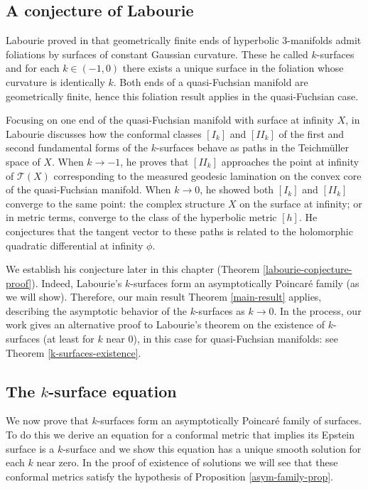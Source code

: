 \documentclass{amsart}
\newcommand{\two}{I\!\!I}
\begin{document}
\subsection{A conjecture of Labourie}



Labourie proved in \cite{labourie1991} that geometrically finite ends of hyperbolic 3-manifolds admit foliations by surfaces of constant Gaussian curvature. 
These he called $k$-surfaces and for each $k \in (-1,0)$ there exists a unique surface in the foliation whose curvature is identically $k$.
Both ends of a quasi-Fuchsian manifold are geometrically finite, hence this foliation result applies in the quasi-Fuchsian case.

Focusing on one end of the quasi-Fuchsian manifold with surface at infinity $X$, in \cite{labourie1992} Labourie discusses how the conformal classes $[I_k]$ and $[\two_k]$ of the first and second fundamental forms of the $k$-surfaces behave as paths in the Teichm\"uller space of $X$. 
When $k \to -1$, he proves that $[\two_k]$ approaches the point at infinity of $\mathcal{T}(X)$ corresponding to the measured geodesic lamination on the convex core of the quasi-Fuchsian manifold. 
When $k \to 0$, he showed both $[I_k]$ and $[\two_k]$ converge to the same point: the complex structure $X$ on the surface at infinity; or in metric terms, converge to the class of the hyperbolic metric $[h]$.
He conjectures that the tangent vector to these paths is related to the holomorphic quadratic differential at infinity $\phi$. 

We establish his conjecture later in this chapter (Theorem \ref{labourie-conjecture-proof}). 
Indeed, Labourie's $k$-surfaces form an asymptotically Poincar\'e family (as we will show). 
Therefore, our main result Theorem \ref{main-result} applies, describing the asymptotic behavior of the $k$-surfaces as $k \to 0$. 
In the process, our work gives an alternative proof to Labourie's theorem on the existence of $k$-surfaces (at least for $k$ near 0), in this case for quasi-Fuchsian manifolds: see Theorem \ref{k-surfaces-existence}.



\subsection{The $k$-surface equation}



We now prove that $k$-surfaces form an asymptotically Poincar\'e family of surfaces. 
To do this we derive an equation for a conformal metric that implies its Epstein surface is a $k$-surface and we show this equation has a unique smooth solution for each $k$ near zero. 
In the proof of existence of solutions we will see that these conformal metrics satisfy the hypothesis of Proposition \ref{asym-family-prop}. 
\end{document}
